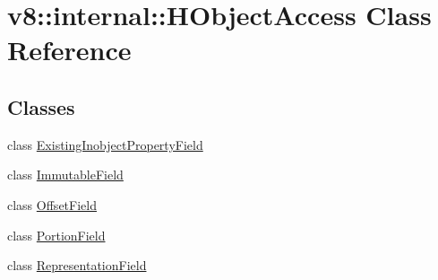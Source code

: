 \hypertarget{classv8_1_1internal_1_1_h_object_access}{}\section{v8\+:\+:internal\+:\+:H\+Object\+Access Class Reference}
\label{classv8_1_1internal_1_1_h_object_access}
\subsection*{Classes}
\begin{DoxyCompactItemize}
\item 
class \hyperlink{classv8_1_1internal_1_1_h_object_access_1_1_existing_inobject_property_field}{Existing\+Inobject\+Property\+Field}
\item 
class \hyperlink{classv8_1_1internal_1_1_h_object_access_1_1_immutable_field}{Immutable\+Field}
\item 
class \hyperlink{classv8_1_1internal_1_1_h_object_access_1_1_offset_field}{Offset\+Field}
\item 
class \hyperlink{classv8_1_1internal_1_1_h_object_access_1_1_portion_field}{Portion\+Field}
\item 
class \hyperlink{classv8_1_1internal_1_1_h_object_access_1_1_representation_field}{Representation\+Field}
\end{DoxyCompactItemize}
